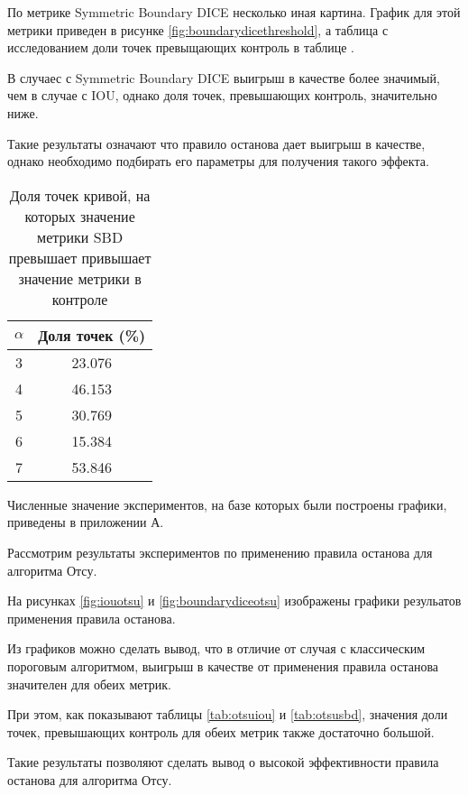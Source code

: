 По метрике Symmetric Boundary DICE несколько иная картина. График для этой метрики приведен в рисунке \ref*{fig:boundarydicethreshold}, а таблица с исследованием доли точек превыщающих контроль в таблице .


В случаес с Symmetric Boundary DICE выигрыш в качестве более значимый, чем в случае с IOU, однако доля точек, превышающих контроль, значительно ниже.

Такие результаты означают что правило останова дает выигрыш в качестве, однако необходимо подбирать его параметры для получения такого эффекта.

\begin{table}[H]
\centering
\caption{Доля точек кривой, на которых значение метрики SBD превышает привышает значение метрики в  контроле}
\label{tab:thresholdingsbd}
\begin{tabular}{|c|c|}
\hline
\(\alpha\) & Доля точек (\%) \\
\hline
3 & 23.076 \\
4 & 46.153 \\
5 & 30.769 \\
6 & 15.384 \\
7 & 53.846 \\
\hline
\end{tabular}
\end{table}

Численные значение экспериментов, на базе которых были построены графики, приведены в приложении А.

Рассмотрим результаты экспериментов по применению правила останова для алгоритма Отсу. 

На рисунках \ref*{fig:iouotsu} и \ref*{fig:boundarydiceotsu} изображены графики резульатов применения правила останова. 

Из графиков можно сделать вывод, что в отличие от случая с классическим пороговым алгоритмом, выигрыш в качестве от применения правила останова значителен для обеих метрик. 

При этом, как показывают таблицы \ref*{tab:otsuiou} и \ref*{tab:otsusbd}, значения доли точек, превышающих контроль для обеих метрик также достаточно большой.
 
Такие результаты позволяют сделать вывод о высокой эффективности правила останова для алгоритма Отсу.

